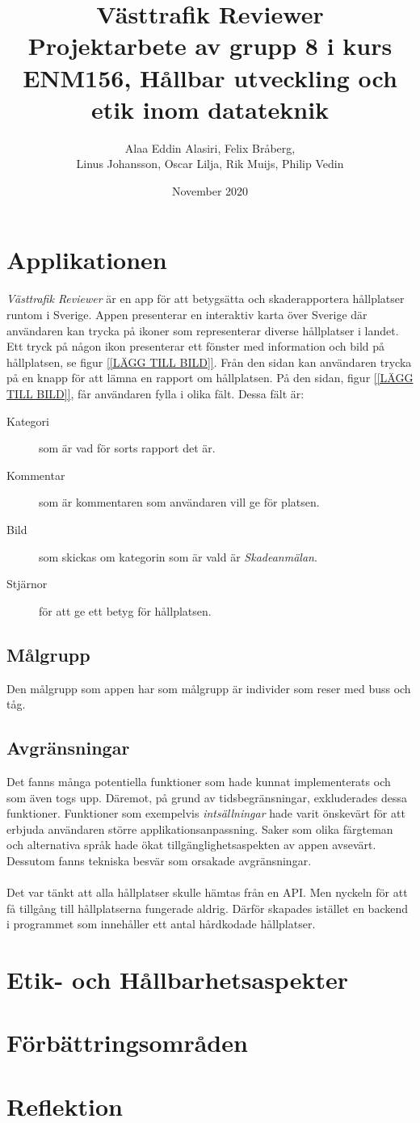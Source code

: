 \documentclass{article}
\title{
  Västtrafik Reviewer \\
  \large Projektarbete av grupp 8 i kurs ENM156, Hållbar utveckling och etik inom datateknik }
\author{Alaa Eddin Alasiri, Felix Bråberg, \\Linus Johansson, Oscar Lilja, Rik Muijs, Philip Vedin}
\date{November 2020}
\begin{document}
\maketitle

\section*{Applikationen}
\textit{Västtrafik Reviewer} är en app för att betygsätta och skaderapportera hållplatser runtom i Sverige. Appen presenterar en interaktiv karta över Sverige där användaren kan trycka på ikoner som representerar diverse hållplatser i landet. Ett tryck på någon ikon presenterar ett fönster med information och bild på hållplatsen, se figur \ref{[LÄGG TILL BILD]}. Från den sidan kan användaren trycka på en knapp för att lämna en rapport om hållplatsen. På den sidan, figur \ref{[LÄGG TILL BILD]}, får användaren fylla i olika fält. Dessa fält är:
\begin{description}
\item[Kategori] som är vad för sorts rapport det är.
\item[Kommentar] som är kommentaren som användaren vill ge för platsen.
\item[Bild] som skickas om kategorin som är vald är \textit{Skadeanmälan}.
\item[Stjärnor] för att ge ett betyg för hållplatsen.
\end{description}

\subsection*{Målgrupp}
Den målgrupp som appen har som målgrupp är individer som reser med buss och tåg. 

\subsection*{Avgränsningar}
Det fanns många potentiella funktioner som hade kunnat implementerats och som även togs upp. Däremot, på grund av tidsbegränsningar, exkluderades dessa funktioner. Funktioner som exempelvis \textit{intsällningar} hade varit önskevärt för att erbjuda användaren större applikationsanpassning. Saker som olika färgteman och alternativa språk hade ökat tillgänglighetsaspekten av appen avsevärt. Dessutom fanns tekniska besvär som orsakade avgränsningar.
\\\\
Det var tänkt att alla hållplatser skulle hämtas från en API. Men nyckeln för att få tillgång till hållplatserna fungerade aldrig. Därför skapades istället en backend i programmet som innehåller ett antal hårdkodade hållplatser. 

\section*{Etik- och Hållbarhetsaspekter}


\section*{Förbättringsområden}
\section*{Reflektion}
\end{document}
